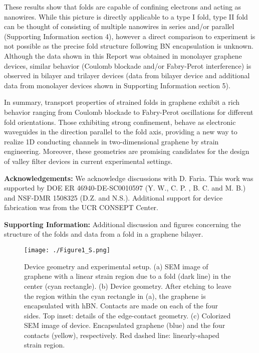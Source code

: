 \documentclass[journal=jacsat,manuscript=article]{achemso}
\begin{document}
These results show that folds are capable of confining electrons and acting as nanowires. While this picture is directly applicable to a type I fold, type II fold can be thought of consisting of multiple nanowires in series and/or parallel (Supporting Information section 4), however a direct comparison to experiment is not possible as the precise fold structure following BN encapsulation is unknown.   
Although the data shown in this Report was obtained in monolayer graphene devices, similar behavior (Coulomb blockade and/or Fabry-Perot interference) is observed in bilayer and trilayer devices (data from bilayer device and additional data from monolayer devices shown in Supporting Information section 5).


In summary, transport properties of strained folds in graphene exhibit a rich behavior ranging from Coulomb blockade to Fabry-Perot oscillations for different fold orientations. Those exhibiting strong confinement, behave as electronic waveguides in the direction parallel to the fold axis, providing a new way to realize 1D conducting channels in two-dimensional graphene by strain engineering. Moreover, these geometries are promising candidates for the design of valley filter devices in current experimental settings.
%








\noindent \textbf{Acknowledgements:}
We acknowledge discussions with D. Faria. This work was supported by DOE ER 46940-DE-SC0010597 (Y. W., C. P. , B. C. and M. B.) and NSF-DMR 1508325 (D.Z. and N.S.). Additional support for device fabrication was from the UCR CONSEPT Center.

\noindent \textbf{Supporting Information:} Additional discussion and figures concerning the structure of the folds and data from a fold in a graphene bilayer.




\newpage

\begin{figure}
\begin{minipage}{\textwidth}
\begin{center}
\texttt{[image: ./Figure1\_S.png]}
\end{center}
\caption{Device geometry and experimental setup. ({a}) SEM image of graphene with a linear strain region due to a fold (dark line) in the center (cyan rectangle). ({b}) Device geometry. After etching to leave the region within the cyan rectangle in ({a}), the graphene is encapsulated with hBN. Contacts are made on each of the four sides. Top inset: details of the edge-contact geometry. ({c}) Colorized SEM image of device. Encapsulated graphene (blue) and the four contacts (yellow), respectively. Red dashed line: linearly-shaped strain region.}
\label{1}
\end{minipage}
\end{figure}
\end{document}
